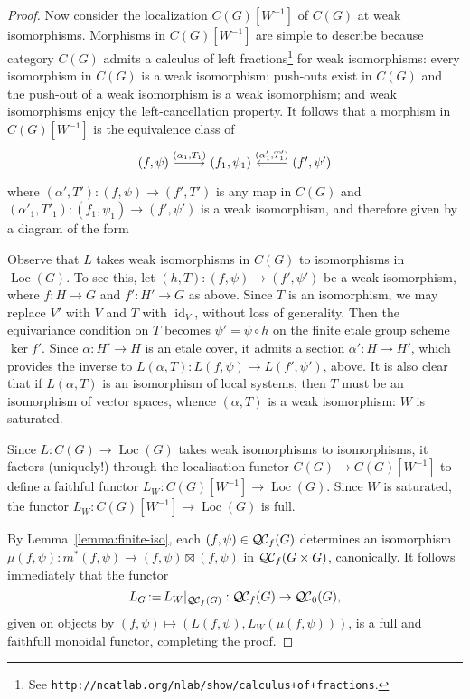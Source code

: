 \documentclass[11pt]{amsart}
\theoremstyle{plain}
\theoremstyle{definition}
\theoremstyle{remark}
\DeclareMathOperator{\id}{id}
\newcommand{\ceq}{{\, :=\, }}
\newcommand{\QC}{{\mathcal{Q\hskip-0.8pt C}}}
\newcommand{\QCb}{{\QC_0}}
\newcommand{\QCf}{{\QC_f}}
\newcommand{\Loc}{{\operatorname{Loc}}}
\begin{document}
\begin{proof}
 Now consider the localization $C(G)[W^{-1}]$ of $C(G)$ at weak isomorphisms.
 Morphisms in $C(G)[W^{-1}]$ are simple to describe because category $C(G)$ 
 admits a calculus of left fractions\footnote{See {\tt http://ncatlab.org/nlab/show/calculus+of+fractions}.} for weak isomorphisms: 
 every isomorphism in $C(G)$ is a weak isomorphism; 
 push-outs exist in $C(G)$ and the push-out of a weak isomorphism is a weak isomorphism; 
 and weak isomorphisms enjoy the left-cancellation property. 
 It follows that a morphism in $C(G)[W^{-1}]$ is the equivalence class of 
  \begin{equation}\label{eq:morGCf}
   \begin{tikzcd}
   (f,\psi) \arrow{r}{(\alpha_1,T_1)} & (f_1,\psi_1) & \arrow[swap]{l}{(\alpha'_1,T'_1)} (f',\psi')
   \end{tikzcd}
  \end{equation}
 where $(\alpha',T') : (f,\psi) \to (f',T')$ is any map in $C(G)$ 
 and $(\alpha'_1,T'_1) : (f_1,\psi_1) \to (f',\psi')$ is a weak isomorphism,
 and therefore given by a diagram of the form

 Observe that $L$ takes weak isomorphisms in $C(G)$ to isomorphisms in $\Loc(G)$. 
 To see this, let $(h,T) : (f,\psi)\to (f',\psi')$ be a weak isomorphism, 
 where $f:H\to G$ and $f':H'\to G$ as above. 
 Since $T$ is an isomorphism, we may replace $V'$ with $V$ and $T$ with $\id_V$, without loss of generality. 
 Then the equivariance condition on $T$ becomes $\psi' = \psi\circ h$ on the finite etale group scheme $\ker f'$. 
 Since $\alpha : H'\to H$ is an etale cover, it admits a section $\alpha' : H \to H'$, 
 which provides the inverse to $L(\alpha,T) : L(f,\psi) \to L(f',\psi')$, above. 
 It is also clear that if $L(\alpha,T)$ is an isomorphism of local systems, 
 then $T$ must be an isomorphism of vector spaces, 
 whence $(\alpha,T)$ is a weak isomorphism: $W$ is saturated.
  
 Since $L : C(G) \to \Loc(G)$ takes weak isomorphisms to isomorphisms,
 it factors (uniquely!) through the localisation functor $C(G) \to C(G)[W^{-1}]$ 
 to define a faithful functor $L_{W} : C(G)[W^{-1}] \to \Loc(G)$. 
 Since $W$ is saturated, the functor $L_{W} : C(G)[W^{-1}] \to \Loc(G)$ is full. 
   
 By Lemma~\ref{lemma:finite-iso}, each $(f,\psi) \in \QCf(G)$ determines 
 an isomorphism $\mu(f,\psi) : m^*(f,\psi) \to (f,\psi) \boxtimes (f,\psi)$ in $\QCf(G\times G)$, canonically.
 It follows immediately that the functor 
 \[
 L_G  \ceq  L_{W}\vert_{\QCf(G)} : \QCf(G) \to \QCb(G),
 \] 
 given on objects by $(f,\psi) \mapsto (L(f,\psi), L_{W}(\mu(f,\psi)))$,
 is a full and faithfull monoidal functor, completing the proof.
\end{proof}
\end{document}
